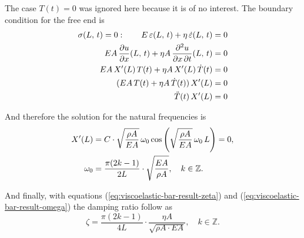 The case $T(t) = 0$ was ignored here because it is of no interest. The boundary condition for the free end is
%
\begin{align}
\sigma(L,\,t) = 0: \quad\quad E\,\varepsilon(L,\,t) + \eta\,\dot{\varepsilon}(L,\,t) &= 0 \notag \\
EA\,\frac{\partial u}{\partial x}(L,\,t) + \eta A\,\frac{\partial^2 u}{\partial x\,\partial t}(L,\,t) &= 0 \notag \\
EA\,X'(L)\,T(t) + \eta A\,X'(L)\,\dot{T}(t) &= 0 \notag \\
(EA\,T(t) + \eta A\,\dot{T}(t))\,X'(L) &= 0 \notag \\
\ddot{T}(t)\,X'(L) &= 0 \notag
\end{align}

And therefore the solution for the natural frequencies is
%
\begin{align}
X'(L) &= C\cdot\sqrt{\frac{\rho A}{EA}}\,\omega_0\cos\left(\sqrt{\frac{\rho A}{EA}}\,\omega_0\,L\right) = 0, \notag \\
\omega_0 &= \frac{\pi(2k - 1)}{2L}\cdot\sqrt{\frac{EA}{\rho A}},\quad k \in \mathbb{Z}.\label{eq:viscoelastic-bar-result-omega}
\end{align}

And finally, with equations (\ref{eq:viscoelastic-bar-result-zeta}) and (\ref{eq:viscoelastic-bar-result-omega}) the damping ratio follow as
%
\begin{equation}
\zeta = \frac{\pi(2k - 1)}{4L}\cdot\frac{\eta A}{\sqrt{\rho A \cdot EA}},\quad k \in \mathbb{Z}.
\end{equation}